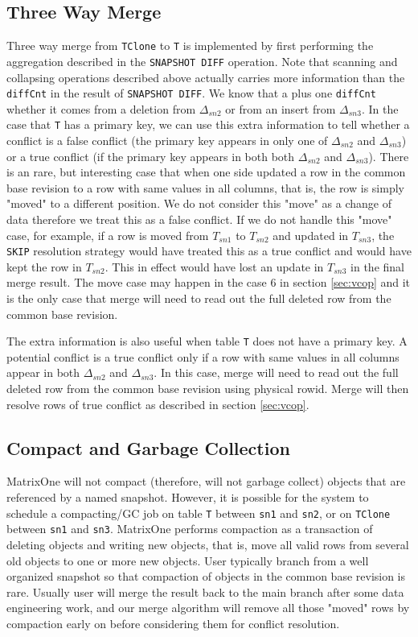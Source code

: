 \documentclass[sigconf,nonacm]{acmart} %
\begin{document}
\subsection{Three Way Merge} \label{sec:threewaymerge}
Three way merge from \texttt{TClone} to \texttt{T} is implemented by first 
performing the aggregation described in the \texttt{SNAPSHOT DIFF} operation.  
Note that scanning and collapsing operations described above actually
carries more information than the \texttt{diffCnt} in the result of 
\texttt{SNAPSHOT DIFF}.  We know that a plus one \texttt{diffCnt} 
whether it comes from a deletion from $\Delta_{sn2}$ or from an insert 
from $\Delta_{sn3}$.  
In the case that \texttt{T} has a primary key, we can use this extra 
information to tell whether a conflict is a false conflict 
(the primary key appears in only one of $\Delta_{sn2}$ and $\Delta_{sn3}$)
or a true conflict 
(if the primary key appears in both both $\Delta_{sn2}$ and $\Delta_{sn3}$).  
There is an rare, but interesting case that when one side updated a row 
in the common base revision to a row with same values in all columns, 
that is, the row is simply "moved" to a different position.  We do not 
consider this "move" as a change of data therefore we treat this as a 
false conflict.  If we do not handle this "move" case, for example,
if a row is moved from $T_{sn1}$ to $T_{sn2}$ and updated in $T_{sn3}$,
the \texttt{SKIP} resolution strategy would have treated this as a true
conflict and would have kept the row in $T_{sn2}$.  This in effect would
have lost an update in $T_{sn3}$ in the final merge result.
The move case may happen in the case 6 in section \ref{sec:vcop} 
and it is the only case that merge will need to read out the full 
deleted row from the common base revision. 

The extra information is also useful when table \texttt{T} does not have
a primary key.  A potential conflict is a true conflict only if a row 
with same values in all columns
appear in both $\Delta_{sn2}$ and $\Delta_{sn3}$.  In this case, merge will 
need to read out the full deleted row from the common base revision using 
physical rowid.  Merge will then resolve rows of true conflict as described
in section \ref{sec:vcop}.

\subsection{Compact and Garbage Collection}
MatrixOne will not compact (therefore, will not garbage collect) objects that 
are referenced by a named snapshot.  However, it is possible for the system to
schedule a compacting/GC job on table \texttt{T} between 
\texttt{sn1} and \texttt{sn2}, 
or on \texttt{TClone} between \texttt{sn1} and \texttt{sn3}.  MatrixOne performs
compaction as a transaction of deleting objects and writing new objects, that is,
move all valid rows from several old objects to one or more new objects.  
User typically branch from a well organized snapshot so that compaction of objects
in the common base revision is rare.  Usually user will merge the result back to the 
main branch after some data engineering work, and our merge algorithm will remove 
all those "moved" rows by compaction early on before considering them for conflict 
resolution.   
\end{document}
